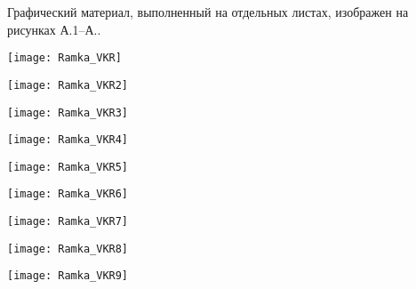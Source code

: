 
Графический материал, выполненный на отдельных листах,
изображен на рисунках А.1--А..
\setcounter{числоПлакатов}{0}

\renewcommand{\thefigure}{А.\arabic{figure}} %

\begin{landscape}

\begin{плакат}
    \texttt{[image: Ramka\_VKR]}
    \label{Ramka_VKR:image}      
\end{плакат}

\begin{плакат}
    \texttt{[image: Ramka\_VKR2]}
    \label{Ramka_VKR2:image}      
\end{плакат}

\begin{плакат}
    \texttt{[image: Ramka\_VKR3]}
    \label{Ramka_VKR3:image}      
\end{плакат}

\begin{плакат}
    \texttt{[image: Ramka\_VKR4]}
    \label{Ramka_VKR4:image}      
\end{плакат}

\begin{плакат}
    \texttt{[image: Ramka\_VKR5]}
    \label{Ramka_VKR5:image}      
\end{плакат}

\begin{плакат}
    \texttt{[image: Ramka\_VKR6]}
    \label{Ramka_VKR6:image}      
\end{плакат}

\begin{плакат}
    \texttt{[image: Ramka\_VKR7]}
    \label{Ramka_VKR7:image}      
\end{плакат}

\begin{плакат}
    \texttt{[image: Ramka\_VKR8]}
    \label{Ramka_VKR8:image}      
\end{плакат}

\begin{плакат}
    \texttt{[image: Ramka\_VKR9]}
    \label{Ramka_VKR9:image}      
\end{плакат}

\end{landscape}
